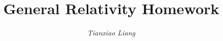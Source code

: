 \documentclass[12pt]{article}
\title{\textbf{General Relativity Homework}}
\author{\emph{Tianxiao Liang} \quad 2018322003}
\begin{document}
\maketitle
\setlength{\parindent}{0pt}	%

\newcommand*{\dif}{\mathop{}\!\mathrm{d}} 		%
\end{document}
